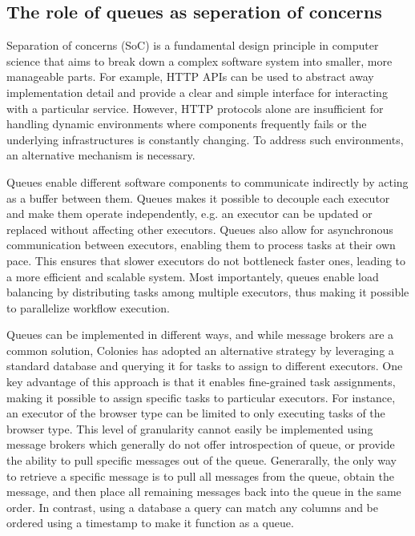 \documentclass{article}
\begin{document}
\subsection{The role of queues as seperation of concerns}
Separation of concerns (SoC) is a fundamental design principle in computer science that aims to break down a complex software system into smaller, more manageable parts. For example, HTTP APIs can be used to abstract away implementation detail and provide a clear and simple interface for interacting with a particular service. However, HTTP protocols alone are insufficient for handling dynamic environments where components frequently fails or the underlying infrastructures is constantly changing. To address such environments, an alternative mechanism is necessary. 

Queues enable different software components to communicate indirectly by acting as a buffer between them. Queues makes it possible to decouple each executor and make them operate independently, e.g. an executor can be updated or replaced without affecting other executors. Queues also allow for asynchronous communication between executors, enabling them to process tasks at their own pace. This ensures that slower executors do not bottleneck faster ones, leading to a more efficient and scalable system. Most importantely, queues enable load balancing by distributing tasks among multiple executors, thus making it possible to parallelize workflow execution.

Queues can be implemented in different ways, and while message brokers are a common solution, Colonies has adopted an alternative strategy by leveraging a standard database and querying it for tasks to assign to different executors. One key advantage of this approach is that it enables fine-grained task assignments, making it possible to assign specific tasks to particular executors. For instance, an executor of the browser type can be limited to only executing tasks of the browser type. This level of granularity cannot easily be implemented using message brokers which generally do not offer introspection of queue, or provide the ability to pull specific messages out of the queue. Generarally, the only way to retrieve a specific message is to pull all messages from the queue, obtain the message, and then place all remaining messages back into the queue in the same order. In contrast, using a database a query can match any columns and be ordered using a timestamp to make it function as a queue.
\end{document}
